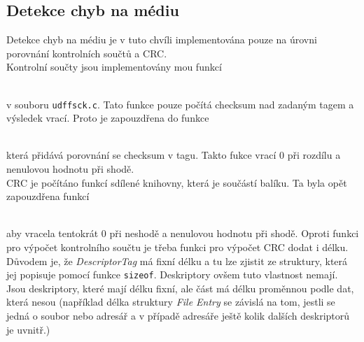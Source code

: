 \subsection{Detekce chyb na médiu}
Detekce chyb na médiu je v tuto chvíli implementována pouze na úrovni porovnání kontrolních součtů a CRC.\\
Kontrolní součty jsou implementovány mou funkcí\\
\centerline{\texttt{}}\\
v souboru \texttt{udffsck.c}. Tato funkce pouze počítá checksum nad zadaným tagem a výsledek vrací. Proto je zapouzdřena do funkce\\ 
\centerline{\texttt{}}\\
která přidává porovnání se checksum v tagu. Takto fukce vrací 0 při rozdílu a nenulovou hodnotu při shodě.\\
CRC je počítáno funkcí sdílené knihovny, která je součástí balíku. Ta byla opět zapouzdřena funkcí\\
\centerline{\texttt{}}\\
aby vracela tentokrát 0 při neshodě a nenulovou hodnotu při shodě. Oproti funkci pro výpočet kontrolního součtu je třeba funkci pro výpočet CRC dodat i délku. Důvodem je, že \textit{DescriptorTag} má fixní délku a tu lze zjistit ze struktury, která jej popisuje pomocí funkce \texttt{sizeof}. Deskriptory ovšem tuto vlastnost nemají. Jsou deskriptory, které mají délku fixní, ale část má délku proměnnou podle dat, která nesou (například délka struktury \textit{File Entry} se závislá na tom, jestli se jedná o soubor nebo adresář a v případě adresáře ještě kolik dalších deskriptorů je uvnitř.)


